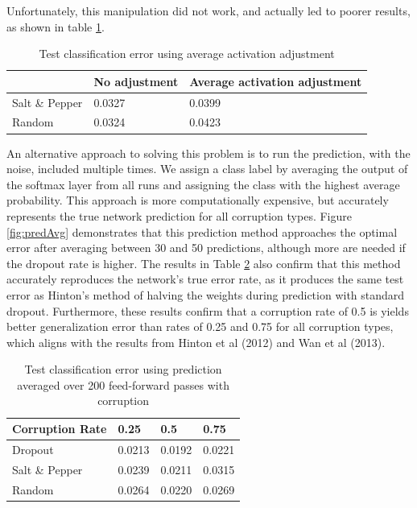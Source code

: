 \documentclass{article} %
\begin{document}
Unfortunately, this manipulation did not work, and actually led to poorer results, as shown in table \ref{tab:testErrorAdj}.

\begin{table}[ht]
\caption{Test classification error using average activation adjustment}
\label{tab:testErrorAdj}
\begin{center}
\begin{tabular}{| l |  l |  l  |}
\hline
 & No adjustment & Average activation adjustment \\
\hline
\hline
Salt \& Pepper & 0.0327 & 0.0399 \\
\hline
Random & 0.0324 & 0.0423 \\
\hline
\end{tabular}
\end{center}
\end{table}

An alternative approach to solving this problem is to run the prediction, with the noise, included multiple times. We assign a class label by averaging the output of the softmax layer from all runs and assigning the class with the highest average probability. This approach is more computationally expensive, but accurately represents the true network prediction for all corruption types. Figure \ref{fig:predAvg} demonstrates that this prediction method approaches the optimal error after averaging between 30 and 50 predictions, although more are needed if the dropout rate is higher. The results in Table \ref{tab:predAvg} also confirm that this method accurately reproduces the network's true error rate, as it produces the same test error as Hinton's method of halving the weights during prediction with standard dropout. Furthermore, these results confirm that a corruption rate of 0.5 is yields better generalization error than rates of 0.25 and 0.75 for all corruption types, which aligns with the results from Hinton et al (2012) and Wan et al (2013).

\begin{table}[ht]
\caption{Test classification error using prediction averaged over 200 feed-forward passes with corruption}
\label{tab:predAvg}
\begin{center}
\begin{tabular}{| l |  l |  l  | l |}
\hline
Corruption Rate & 0.25 & 0.5 & 0.75 \\
\hline
\hline
Dropout & 0.0213 & 0.0192 & 0.0221 \\
\hline
Salt \& Pepper & 0.0239 & 0.0211 & 0.0315 \\
\hline
Random & 0.0264 & 0.0220 & 0.0269 \\
\hline
\end{tabular}
\end{center}
\end{table}
\end{document}
